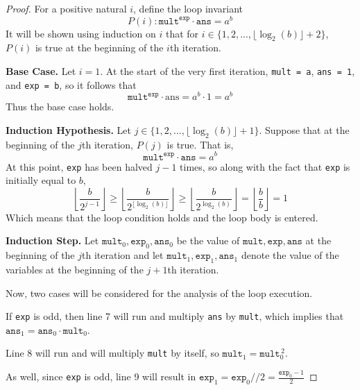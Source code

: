 \documentclass[11pt]{article}
\begin{document}
\begin{enumerate}[label=(\alph*)]
\begin{proof}
            For a positive natural \(i\), define the loop invariant
            \[
                P(i) : \texttt{mult}^\texttt{exp} \cdot \texttt{ans} = a^b
            \]
            It will be shown using induction on \(i\) that for \(i \in \{1, 2,..., \lfloor \log _2 (b) \rfloor + 2\}\), \(P(i)\) is true at the beginning of the \(i\)th iteration.

            \textbf{Base Case.} Let \(i=1\). At the start of the very first iteration, \verb|mult = a|, \verb|ans = 1|, and \verb|exp = b|, so it follows that
            \[
                \texttt{mult}^\texttt{exp} \cdot \text{ans} = a^b \cdot 1 = a^b
            \]
            Thus the base case holds.

            \textbf{Induction Hypothesis.} Let \(j \in \{1,2,..., \lfloor \log _2(b) \rfloor + 1\}\). Suppose that at the beginning of the \(j\)th iteration, \(P(j)\) is true. That is,
            \[
                \texttt{mult}^\texttt{exp} \cdot \texttt{ans} = a^b
            \]
            At this point, \verb|exp| has been halved \(j-1\) times, so along with the fact that \verb|exp| is initially equal to \(b\),
            \[
                \left\lfloor \frac{b}{2^{j-1}} \right\rfloor \geq \left\lfloor \frac{b}{2^{\lfloor \log _2(b) \rfloor}} \right\rfloor \geq \left\lfloor \frac{b}{2^{\log _2(b)}} \right\rfloor = \left\lfloor \frac{b}{b} \right\rfloor = 1
            \]
            Which means that the loop condition holds and the loop body is entered.

            \textbf{Induction Step.} Let \(\texttt{mult}_{0},\texttt{exp}_{0},\texttt{ans}_{0}\) be the value of  \(\texttt{mult},\texttt{exp},\texttt{ans}\) at the beginning of the \(j\)th iteration and let \(\texttt{mult}_{1},\texttt{exp}_{1},\texttt{ans}_{1}\) denote the value of the variables at the beginning of the \(j+1\)th iteration.

            Now, two cases will be considered for the analysis of the loop execution.

            If \verb|exp| is odd, then line 7 will run and multiply \verb|ans| by \verb|mult|, which implies that \(\texttt{ans}_1 = \texttt{ans}_0 \cdot \texttt{mult}_0\).

            Line 8 will run and will multiply \verb|mult| by itself, so \(\texttt{mult}_1 = \texttt{mult}_0^{\, 2}\).
            
            As well, since \verb|exp| is odd, line 9 will result in \(\texttt{exp}_1 = \texttt{exp}_0 // 2 = \frac{\texttt{exp}_0 - 1}{2}\)


\end{proof}
\end{enumerate}
\end{document}
